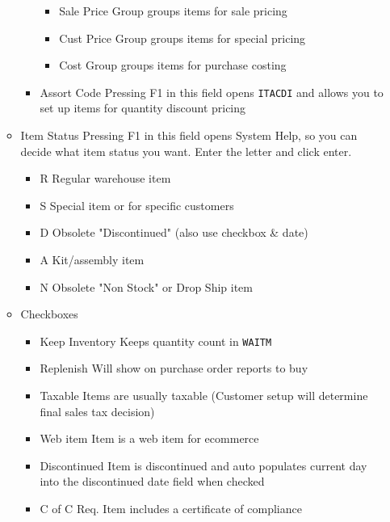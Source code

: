 \begin{enumerate}
\begin{itemize}
\begin{itemize}
\begin{itemize}
				\item Sale Price Group \textemdash groups items for sale pricing
				\item Cust Price Group \textemdash groups items for special pricing
				\item Cost Group \textemdash groups items for purchase costing
			\end{itemize}
			\item Assort Code \textemdash Pressing F1 in this field opens \texttt{ITACDI} and allows you to set up items for quantity discount pricing
		\end{itemize}
		\item Item Status \textemdash Pressing F1 in this field opens System Help, so you can decide what item status you want. Enter the letter and click enter.
		\begin{itemize}
			\item R \textemdash Regular warehouse item
			\item S \textemdash Special item or for specific customers
			\item D \textemdash Obsolete "Discontinued" (also use checkbox \& date)
			\item A \textemdash Kit/assembly item
			\item N \textemdash Obsolete "Non Stock" or Drop Ship item
		\end{itemize}
		\item Checkboxes
		\begin{itemize}
			\item Keep Inventory \textemdash Keeps quantity count in \texttt{WAITM}
			\item Replenish \textemdash Will show on purchase order reports to buy
			\item Taxable \textemdash Items are usually taxable (Customer setup will determine final sales tax decision)
			\item Web item \textemdash Item is a web item for ecommerce
			\item Discontinued \textemdash Item is discontinued and auto populates current day into the discontinued date field when checked
			\item C of C Req. \textemdash Item includes a certificate of compliance			
		\end{itemize}		
	\end{itemize}
	\begin{figure}[H]

\end{figure}
\end{enumerate}
